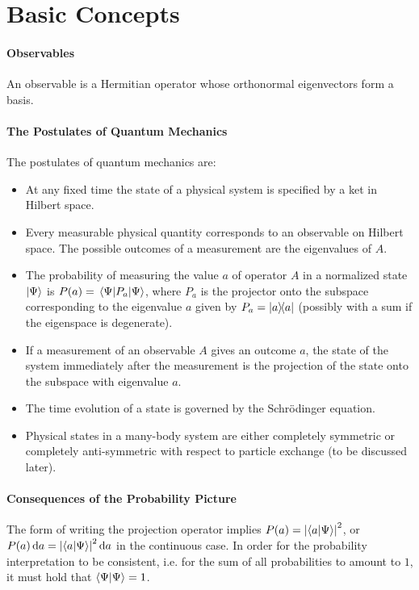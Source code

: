 \section{Basic Concepts}

\paragraph{Observables}
An observable is a Hermitian operator whose orthonormal eigenvectors form a basis.

\paragraph{The Postulates of Quantum Mechanics}
The postulates of quantum mechanics are:
\begin{itemize}
	\item At any fixed time the state of a physical system is specified by a ket in Hilbert space.
	\item Every measurable physical quantity corresponds to an observable on Hilbert space. The possible outcomes of a measurement are the eigenvalues of $A$.
	\item The probability of measuring the value $a$ of operator $A$ in a normalized state $\ket{\Psi}$ is $P(a) = \expval{P_{a}}{\Psi}$, where $P_{a}$ is the projector onto the subspace corresponding to the eigenvalue $a$ given by $P_{a} = \dyad{a}{a}$ (possibly with a sum if the eigenspace is degenerate).
	\item If a measurement of an observable $A$ gives an outcome $a$, the state of the system immediately after the measurement is the projection of the state onto the subspace with eigenvalue $a$.
	\item The time evolution of a state is governed by the Schrödinger equation.
	\item Physical states in a many-body system are either completely symmetric or completely anti-symmetric with respect to particle exchange (to be discussed later).
\end{itemize}

\paragraph{Consequences of the Probability Picture}
The form of writing the projection operator implies $P(a) = \abs{\bra{a}\ket{\Psi}}^{2}$, or $P(a)\dd{a} = \abs{\bra{a}\ket{\Psi}}^{2}\dd{a}$ in the continuous case. In order for the probability interpretation to be consistent, i.e. for the sum of all probabilities to amount to $1$, it must hold that $\bra{\Psi}\ket{\Psi} = 1$.

